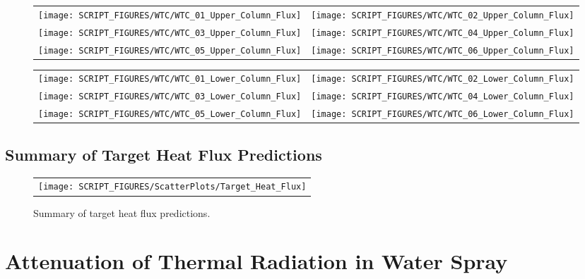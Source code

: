 \begin{figure}[p]
\begin{tabular*}{\textwidth}{l@{\extracolsep{\fill}}r}
\texttt{[image: SCRIPT\_FIGURES/WTC/WTC\_01\_Upper\_Column\_Flux]} &
\texttt{[image: SCRIPT\_FIGURES/WTC/WTC\_02\_Upper\_Column\_Flux]} \\
\texttt{[image: SCRIPT\_FIGURES/WTC/WTC\_03\_Upper\_Column\_Flux]} &
\texttt{[image: SCRIPT\_FIGURES/WTC/WTC\_04\_Upper\_Column\_Flux]} \\
\texttt{[image: SCRIPT\_FIGURES/WTC/WTC\_05\_Upper\_Column\_Flux]} &
\texttt{[image: SCRIPT\_FIGURES/WTC/WTC\_06\_Upper\_Column\_Flux]}
\end{tabular*}
\label{NIST_WTC_Upper_Column_Flux}
\end{figure}

\begin{figure}[p]
\begin{tabular*}{\textwidth}{l@{\extracolsep{\fill}}r}
\texttt{[image: SCRIPT\_FIGURES/WTC/WTC\_01\_Lower\_Column\_Flux]} &
\texttt{[image: SCRIPT\_FIGURES/WTC/WTC\_02\_Lower\_Column\_Flux]} \\
\texttt{[image: SCRIPT\_FIGURES/WTC/WTC\_03\_Lower\_Column\_Flux]} &
\texttt{[image: SCRIPT\_FIGURES/WTC/WTC\_04\_Lower\_Column\_Flux]} \\
\texttt{[image: SCRIPT\_FIGURES/WTC/WTC\_05\_Lower\_Column\_Flux]} &
\texttt{[image: SCRIPT\_FIGURES/WTC/WTC\_06\_Lower\_Column\_Flux]}
\end{tabular*}
\label{NIST_WTC_Lower_Column_Flux}
\end{figure}


\clearpage

\subsection{Summary of Target Heat Flux Predictions}

\begin{figure}[h!]
\begin{center}
\begin{tabular}{c}
\texttt{[image: SCRIPT\_FIGURES/ScatterPlots/Target\_Heat\_Flux]}
\end{tabular}
\end{center}
\caption[Summary of target heat flux predictions]
{Summary of target heat flux predictions.}
\end{figure}



\clearpage

\section{Attenuation of Thermal Radiation in Water Spray}


